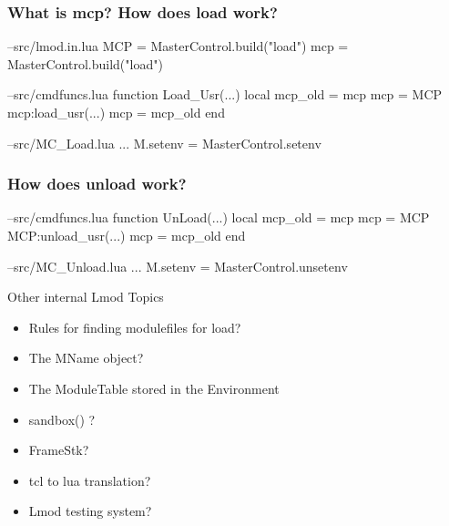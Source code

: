 \documentclass{beamer}
\begin{document}
\begin{frame}[fragile]
  \frametitle{What is mcp? How does load work?}
    {\tiny
\begin{semiverbatim}
--src/lmod.in.lua
   MCP = MasterControl.build("load")
   mcp = MasterControl.build("load")

--src/cmdfuncs.lua
function Load\_Usr(...)
   local mcp\_old = mcp
   mcp = MCP
   mcp:load\_usr(...)
   mcp = mcp\_old
end

--src/MC\_Load.lua
...
M.setenv               = MasterControl.setenv
\end{semiverbatim}
    }
\end{frame}

\begin{frame}[fragile]
  \frametitle{How does unload work?}
    {\tiny
\begin{semiverbatim}
--src/cmdfuncs.lua
function UnLoad(...)
   local mcp\_old = mcp
   mcp = MCP
   MCP:unload\_usr(...)
   mcp = mcp\_old
end

--src/MC_Unload.lua
...
M.setenv               = MasterControl.unsetenv
\end{semiverbatim}
    }
\end{frame}

\begin{frame}{Other internal Lmod Topics}
  \begin{itemize}
    \item Rules for finding modulefiles for load?
    \item The MName object?
    \item The ModuleTable stored in the Environment
    \item sandbox() ?
    \item FrameStk?
    \item tcl to lua translation?
    \item Lmod testing system? 
  \end{itemize}
\end{frame}
\end{document}

